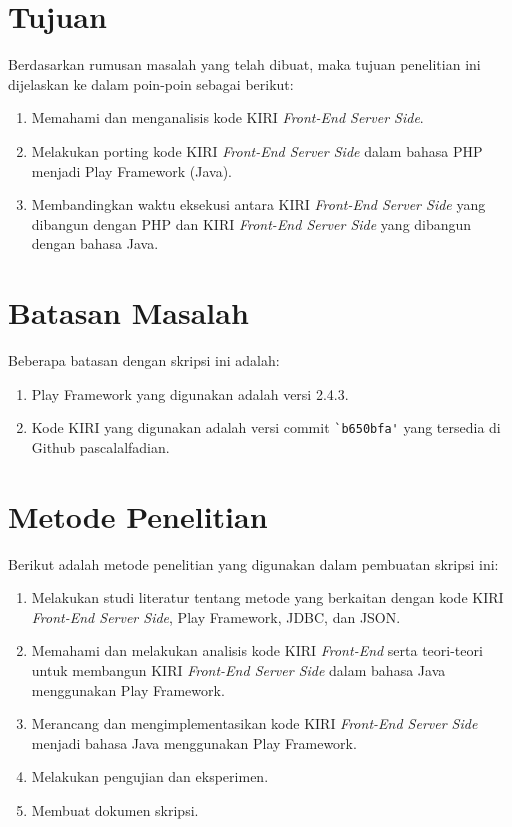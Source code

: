 \section{Tujuan}
\label{sec:tujuan}
Berdasarkan rumusan masalah yang telah dibuat, maka tujuan penelitian ini dijelaskan ke dalam poin-poin sebagai berikut:
\begin{enumerate}
	\item Memahami dan menganalisis kode KIRI \textit{Front-End Server Side}.
	\item Melakukan porting kode KIRI \textit{Front-End Server Side} dalam bahasa PHP menjadi Play Framework (Java).
	\item Membandingkan waktu eksekusi antara KIRI \textit{Front-End Server Side} yang dibangun dengan PHP dan KIRI \textit{Front-End Server Side} yang dibangun dengan bahasa Java.
\end{enumerate}

\section{Batasan Masalah}
\label{sec:batasanMasalah}
Beberapa batasan dengan skripsi ini adalah:
\begin{enumerate}
	\item Play Framework yang digunakan adalah versi 2.4.3.
	\item Kode KIRI yang digunakan adalah versi commit \verb!`b650bfa'! yang tersedia di Github pascalalfadian\cite{githubkiri}.
\end{enumerate}

\section{Metode Penelitian}
\label{sec:metodePenelitian}
Berikut adalah metode penelitian yang digunakan dalam pembuatan skripsi ini:
	\begin{enumerate}
		\item Melakukan studi literatur tentang metode yang berkaitan dengan kode KIRI \textit{Front-End Server Side}, Play Framework, JDBC, dan JSON.
		\item Memahami dan melakukan analisis kode KIRI \textit{Front-End} serta teori-teori untuk membangun KIRI \textit{Front-End Server Side} dalam bahasa Java menggunakan Play Framework.
		\item Merancang dan mengimplementasikan kode KIRI \textit{Front-End Server Side} menjadi bahasa Java menggunakan Play Framework.
		\item Melakukan pengujian dan eksperimen.
		\item Membuat dokumen skripsi.
	\end{enumerate}
	
